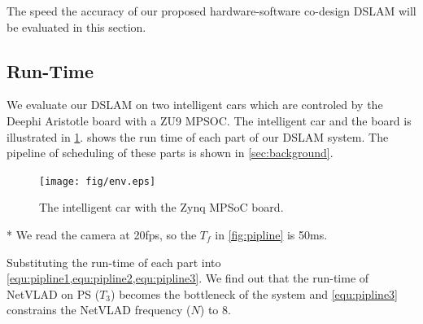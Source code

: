\label{sec:experiment}
The speed the accuracy of our proposed hardware-software co-design DSLAM will be evaluated in this section.

\subsection{Run-Time}

We evaluate our DSLAM on two intelligent cars which are controled by the Deephi Aristotle board with a ZU9 MPSOC. The intelligent car and the board is illustrated in \cref{fig:env}.  shows the run time of each part of our DSLAM system. The pipeline of scheduling of these parts is shown in \cref{sec:background}.


\begin{figure}[t]
    \centering  
    \texttt{[image: fig/env.eps]}
    \caption{The intelligent car with the Zynq MPSoC board.}
    \label{fig:env}
\end{figure}

\begin{table}[h]
    \centering
    \caption{Run-Time of each part in our DSLAM}
    \footnotesize
    \begin{threeparttable}
  \begin{tablenotes}
        \item[*] We read the camera at 20fps, so the $T_{f}$ in \cref{fig:pipline} is 50ms.
        \end{tablenotes}
      \end{threeparttable}
    \label{tab:time}%
    
  \end{table}%

Substituting the run-time of each part into \cref{equ:pipline1,equ:pipline2,equ:pipline3}. We find out that the run-time of NetVLAD on PS ($T_{3}$) becomes the bottleneck of the system and \cref{equ:pipline3} constrains the NetVLAD frequency ($N$) to $8$.

